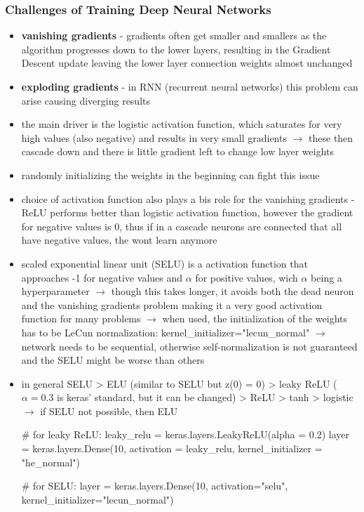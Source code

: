 \documentclass[12pt,a4paper]{article}
\begin{document}
\subsubsection{Challenges of Training Deep Neural Networks} %
\label{ssub:challenges_of_training_deep_neural_networks}
\begin{itemize}
  \item \textbf{vanishing gradients} - gradients often get smaller and smallers as the algorithm progresses down to the lower layers, resulting in the Gradient Descent update leaving the lower layer connection weights almost unchanged
  \item \textbf{exploding gradients} - in RNN (recurrent neural networks) this problem can arise causing diverging results
  \item the main driver is the logistic activation function, which saturates for very high values (also negative) and results in very small gradients
  \newline \indent $\longrightarrow$ these then cascade down and there is little gradient left to change low layer weights 
  \item randomly initializing the weights in the beginning can fight this issue
  \item choice of activation function also plays a bis role for the vanishing gradients - ReLU performs better than logistic activation function, however the gradient for negative values is 0, thus if in a cascade neurons are connected that all have negative values, the wont learn anymore
  \item scaled exponential linear unit (SELU) is a activation function that approaches -1 for negative values and $\alpha$ for positive values, wich $\alpha$ being a hyperparameter
  \newline \indent $\longrightarrow$ though this takes longer, it avoids both the dead neuron and the vanishing gradients problem making it a very good activation function for many problems
  \newline \indent $\longrightarrow$ when used, the initialization of the weights has to be LeCun normalization: kernel\_initializer="lecun\_normal"
  \newline \indent $\longrightarrow$ network needs to be sequential, otherwise self-normalization is not guaranteed and the SELU might be worse than others
  \item in general SELU > ELU (similar to SELU but z(0) = 0) > leaky ReLU ($\alpha = 0.3$ is keras' standard, but it can be changed) > ReLU > tanh > logistic
  \newline \indent $\longrightarrow$ if SELU not possible, then ELU
  \begin{python}
    # for leaky ReLU:
    leaky_relu = keras.layers.LeakyReLU(alpha = 0.2)
    layer = keras.layers.Dense(10, activation = leaky_relu,
                                kernel_initializer = "he_normal")

    # for SELU:
    layer = keras.layers.Dense(10, activation="selu",
                                kernel_initializer="lecun_normal")
  \end{python}

\end{itemize}
\end{document}
